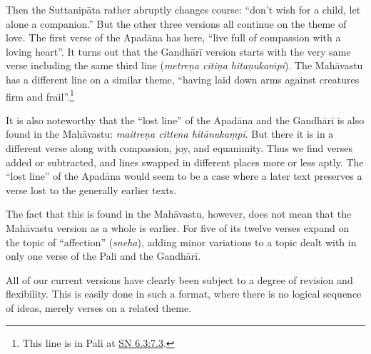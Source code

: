 \documentclass[12pt,openany]{book}%
\begin{document}
Then the \textsanskrit{Suttanipāta} rather abruptly changes course: “don’t wish for a child, let alone a companion.” But the other three versions all continue on the theme of love. The first verse of the \textsanskrit{Apadāna} has here, “live full of compassion with a loving heart”. It turns out that the \textsanskrit{Gandhārī} version starts with the very same verse including the same third line (\textit{\textsanskrit{metreṇa} \textsanskrit{citiṇa} \textsanskrit{hitaṇ}‍\textsanskrit{ukaṁpi}}). The \textsanskrit{Mahāvastu} has a different line on a similar theme, “having laid down arms against creatures firm and frail”.\footnote{This line is in Pali at \href{https://suttacentral.net/sn6.3/en/sujato\#7.3}{SN 6.3:7.3}. }

It is also noteworthy that the “lost line” of the \textsanskrit{Apadāna} and the \textsanskrit{Gandhārī} is also found in the \textsanskrit{Mahāvastu}: \textit{\textsanskrit{maitreṇa} cittena \textsanskrit{hitānukaṃpī}}. But there it is in a different verse along with compassion, joy, and equanimity. Thus we find verses added or subtracted, and lines swapped in different places more or less aptly. The “lost line” of the \textsanskrit{Apadāna} would seem to be a case where a later text preserves a verse lost to the generally earlier texts.

The fact that this is found in the \textsanskrit{Mahāvastu}, however, does not mean that the \textsanskrit{Mahāvastu} version as a whole is earlier. For five of its twelve verses expand on the topic of “affection” (\textit{sneha}), adding minor variations to a topic dealt with in only one verse of the Pali and the \textsanskrit{Gandhārī}.

All of our current versions have clearly been subject to a degree of revision and flexibility. This is easily done in such a format, where there is no logical sequence of ideas, merely verses on a related theme.
\end{document}
